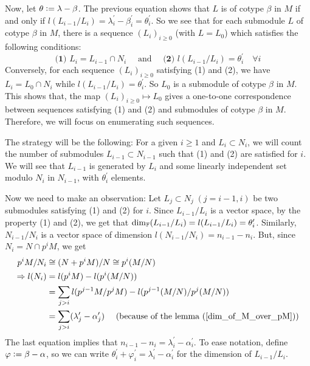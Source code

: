 Now, let $\theta\bydef\lambda-\beta$. The previous equation shows that $L$ is of cotype $\beta$ in $M$ if and only if $l(L_{i-1}/L_i)=\lambda_i^\prime-\beta_i^\prime=\theta_i^\prime$. So we see that for each  submodule $L$ of cotype $\beta$ in $M$, there is a sequence $(L_i)_{i\geq0}$ (with $L=L_0$) which satisfies the following conditions:
\begin{equation}
    \textbf{(1) } L_i=L_{i-1}\cap N_i\quad\text{ and }\quad\textbf{(2) }l(L_{i-1}/L_i)=\theta_i^\prime\quad\forall i
\end{equation}
Conversely, for each sequence $(L_i)_{i\geq0}$ satisfying (1) and (2), we have $L_i = L_0\cap N_i$ while $l(L_{i-1}/L_i)=\theta_i^\prime$. So $L_0$ is a submodule of cotype $\beta$ in $M$. This shows that, the map $(L_i)_{i\geq0}\mapsto L_0$ gives a one-to-one correspondence between sequences satisfying (1) and (2) and submodules of cotype $\beta$ in $M$. Therefore, we will focus on enumerating such sequences.
\par
The strategy will be the following: For a given $i\geq1$ and $L_i\subset N_i$, we will count the number of submodules $L_{i-1}\subset N_{i-1}$ such that (1) and (2) are satisfied for $i$. We will see that $L_{i-1}$ is generated by $L_i$ and some linearly independent set modulo $N_i$ in $N_{i-1}$, with $\theta_i^\prime$ elements.\par
Now we need to make an observation: Let $L_j\subset N_j\;(j=i-1,i)$ be two submodules satisfying (1) and (2) for $i$. Since $L_{i-1}/L_i$ is a vector space, by the property (1) and (2), we get that $\text{dim}_{\mathbb{F}}(L_{i-1}/L_i)=l(L_{i-1}/L_i)=\theta_i^\prime$. Similarly, $N_{i-1}/N_i$ is a vector space of dimension $l(N_{i-1}/N_i)=n_{i-1}-n_i$. But, since $N_i=N\cap p^iM$, we get
\begin{equation}
\begin{split}
        p^iM/N_i &\cong (N+p^iM)/N\cong p^i(M/N) \\
        \Rightarrow l(N_i)&=l(p^iM)-l(p^i(M/N))\\
        &=\sum_{j>i}l(p^{j-1}M/p^jM)-l(p^{j-1}(M/N)/p^j(M/N))\\
        &=\sum_{j>i}(\lambda_j^\prime-\alpha_j^\prime)\quad\text{ (because of the lemma~(\ref{dim_of_M_over_pM})})
\end{split}
\end{equation}
The last equation implies that $n_{i-1}-n_i=\lambda_i^\prime-\alpha_i^\prime$. To ease notation, define $\varphi\bydef \beta-\alpha$, so we can write $\theta_i^\prime+\varphi_i^\prime=\lambda_i^\prime-\alpha_i^\prime$ for the dimension of $L_{i-1}/L_i$.\par
